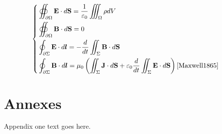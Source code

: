 \documentclass{wsdcr}
\begin{document}
\begin{equation}
\left\{
\begin{aligned}
    &\oiint_{\partial\Omega}{\mathbf{E}\cdot d\mathbf{S}}=\frac 1{\varepsilon_0}\iiint_\Omega{\rho dV}\\
    &\oiint_{\partial\Omega}{\mathbf{B}\cdot d\mathbf{S}}=0\\
    &\oint_{\partial\Sigma}{\mathbf{E}\cdot d\boldsymbol{l}}=-\frac d{dt} \iint_\Sigma{{\mathbf{B}\cdot d\mathbf{S}}}\\
    &\oint_{\partial\Sigma}{\mathbf{B}\cdot d\boldsymbol{l}}=\mu_0 \left(\iint_\Sigma{{\mathbf{J}\cdot d\mathbf{S}}}+\varepsilon_0\frac d{dt} \iint_\Sigma{{\mathbf{E}\cdot d\mathbf{S}}}\right)\cite{Maxwell1865}
\end{aligned}
\right.
\end{equation}

\appendices
\section{Annexes}
Appendix one text goes here.






\end{document}
